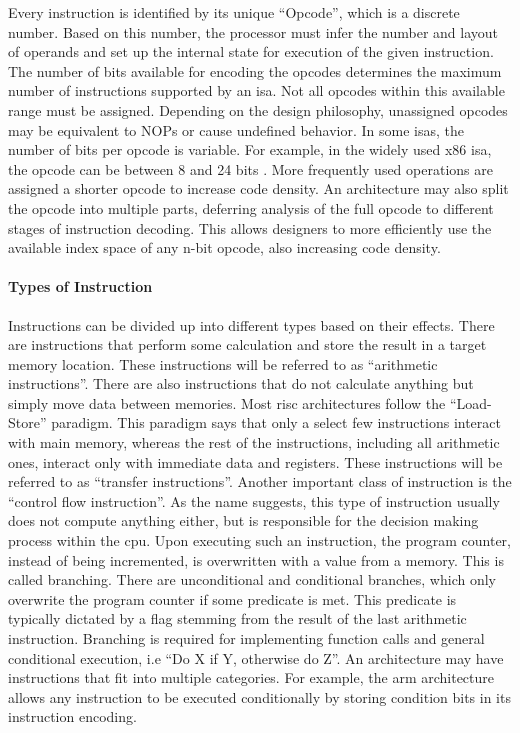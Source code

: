 Every instruction is identified by its unique ``Opcode'', which is a discrete number. Based on this number, the processor must infer the number and layout of operands and set up the internal state for execution of the given instruction. The number of bits available for encoding the opcodes determines the maximum number of instructions supported by an \ac{isa}. Not all opcodes within this available range must be assigned. Depending on the design philosophy, unassigned opcodes may be equivalent to NOPs or cause undefined behavior. In some \acp{isa}, the number of bits per opcode is variable. For example, in the widely used x86 \ac{isa}, the opcode can be between 8 and 24 bits \cite{mahoney2021enumerating}. More frequently used operations are assigned a shorter opcode to increase code density. An architecture may also split the opcode into multiple parts, deferring analysis of the full opcode to different stages of instruction decoding. This allows designers to more efficiently use the available index space of any n-bit opcode, also increasing code density.

\paragraph*{Types of Instruction}

Instructions can be divided up into different types based on their effects. There are instructions that perform some calculation and store the result in a target memory location. These instructions will be referred to as ``arithmetic instructions''. There are also instructions that do not calculate anything but simply move data between memories. Most \ac{risc} architectures follow the ``Load-Store'' paradigm. This paradigm says that only a select few instructions interact with main memory, whereas the rest of the instructions, including all arithmetic ones, interact only with immediate data and registers. These instructions will be referred to as ``transfer instructions''. Another important class of instruction is the ``control flow instruction''. As the name suggests, this type of instruction usually does not compute anything either, but is responsible for the decision making process within the \ac{cpu}. Upon executing such an instruction, the program counter, instead of being incremented, is overwritten with a value from a memory. This is called branching. There are unconditional and conditional branches, which only overwrite the program counter if some predicate is met. This predicate is typically dictated by a flag stemming from the result of the last arithmetic instruction. Branching is required for implementing function calls and general conditional execution, i.e ``Do X if Y, otherwise do Z''. An architecture may have instructions that fit into multiple categories. For example, the \ac{arm} architecture allows any instruction to be executed conditionally\cite{armv7m_manual} by storing condition bits in its instruction encoding.

